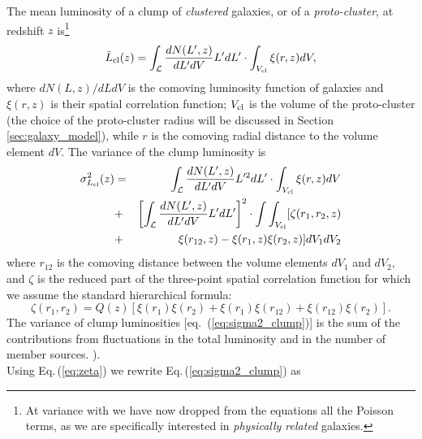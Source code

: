 \documentclass[useAMS,usenatbib]{mn2e}
\begin{document}
The mean luminosity of
a clump of {\it clustered} galaxies, or of a {\it proto-cluster}, at
redshift $z$ is\footnote{At variance with \cite{Negrello2005} we have now
  dropped from the equations all the Poisson terms, as we are
   specifically interested in {\it physically related} galaxies.} \citep{Peebles1980}
%
\begin{equation}\label{eq:meanL_clump}
%
\bar{L}_{\rm cl}(z) = \int_{\mathcal L}
\frac{dN(L^{\prime},z)}{dL^{\prime}dV} L^{\prime} dL^{\prime} \cdot
\int_{V_{\rm cl}}\xi(r,z) dV,
%
\end{equation}
%
where $dN(L,z)/dLdV$ is the comoving luminosity function of galaxies
and $\xi(r,z)$ is their spatial correlation function; $V_{\rm cl}$ is
the volume of the proto-cluster (the choice of the proto-cluster
radius will be discussed in Section\,\ref{sec:galaxy_model}), while
$r$ is the comoving radial distance to the volume element $dV$.
%
The variance of the clump luminosity is
%
\begin{eqnarray}\label{eq:sigma2_clump}
\sigma^{2}_{L_{\rm cl}}(z) & = & \int_{\mathcal L}
                             \frac{dN(L^{\prime},z)}{dL^{\prime}dV}
                             L^{\prime 2} dL^{\prime} \cdot
                             \int_{V_{\rm cl}}\xi(r,z)dV
\nonumber \\
& + & \left[ \int_{\mathcal L} \frac{dN(L^{\prime},z)}{dL^{\prime}dV}
L^{\prime} dL^{\prime} \right]^{2} \cdot  \int\int_{V_{\rm cl}}[\zeta(r_{1},r_{2},z)  \nonumber \\
& +&\xi(r_{12},z) - \xi(r_{1},z)\xi(r_{2},z)]dV_{1}dV_{2}
\end{eqnarray}
%
where $r_{12}$ is the comoving distance between the volume elements
$dV_{1}$ and $dV_{2}$, and $\zeta$ is the reduced part of the three-point spatial correlation function for which we assume the standard hierarchical formula:
%
\begin{equation}\label{eq:zeta}
\zeta(r_{1},r_{2}) = Q(z)\left[  \xi(r_{1})\xi(r_{2}) + \xi(r_{1})\xi(r_{12}) + \xi(r_{12})\xi(r_{2}) \right].
\end{equation}
%
The variance of clump luminosities [eq.~(\ref{eq:sigma2_clump})] is the sum of the contributions from fluctuations in the total
luminosity and in the number of member sources. ). \\
Using Eq.\,(\ref{eq:zeta}) we rewrite Eq.\,(\ref{eq:sigma2_clump}) as
%
\end{document}
